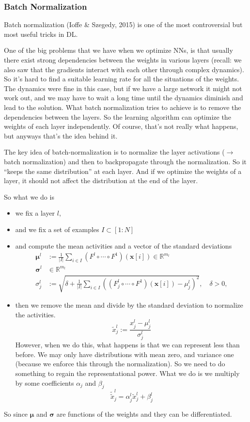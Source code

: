 \documentclass[a2paper,8pt]{extarticle}
\newcommand{\R}{\mathbb{R}}
\newcommand{\card}[1]{\left\lvert #1 \right\rvert}
\renewcommand{\vec}[1]{\mathbf{#1}}
\newcommand{\vx}{\vec{x}}
\newcommand{\vmu}{\boldsymbol{\mu}}
\newcommand{\vsigma}{\boldsymbol{\sigma}}
\newcommand{\ssep}{\hdashrule[1.1ex]{\linewidth}{0.1pt}{0.3mm}\vspace{-6pt}}
\newcommand{\ssep}{\hdashrule[1.1ex]{\linewidth}{0.1pt}{0.3mm}\vspace{-3pt}}
\begin{document}
\begin{landscape}
\begin{multicols*}{7}
\subsubsection{Batch Normalization}

Batch normalization (Ioffe \& Szegedy, 2015) is one of the most controversial
but most useful tricks in DL. 

One of the big problems that we have when we optimize NNs, is that usually there
exist strong dependencies between the weights in various layers (recall: we also
saw that the gradients interact with each other through complex dynamics). So
it's hard to find a suitable learning rate for all the situations of the
weights. The dynamics were fine in this case, but if we have a large network it
might not work out, and we may have to wait a long time until the dynamics
diminish and lead to the solution. What batch normalization tries to achieve is
to remove the dependencies between the layers. So the learning algorithm can
optimize the weights of each layer independently. Of course, that's not really
what happens, but anyways that's the idea behind it.

\ssep

The key idea of batch-normalization is to normalize the layer activations
($\to$ batch normalization) and then to backpropagate through the normalization.
So it ``keeps the same distribution'' at each layer. And if we optimize the
weights of a layer, it should not affect the distribution at the end of the
layer.

So what we do is
\begin{itemize}
  \item we fix a layer $l$,
  \item and we fix a set of examples $I\subset[1:N]$
  \item and compute the mean activities and a vector of the standard deviations
\begin{align*}
\vmu^{l}
&:=
\frac{1}{\card{I}}
\sum_{i\in I}
(F^l\circ\cdots\circ F^1)(\vx[i])\in\R^{m_l}
\\
\vsigma^l&\in\R^{m_l}
\\
\sigma_j^l
&:=
\sqrt{
\delta
+
\frac{1}{\card{I}}
\sum_{i\in I}
\left(
(F^l_j\circ\cdots\circ F^1)(\vx[i])
-\mu_j^l
\right)^2
},
\quad
\delta > 0,
\end{align*}
  \item then we remove the mean and divide by the standard deviation to
  normalize the activities.
  \[
  \tilde{x}_j^l
  :=\frac{x_j^l-\mu_j^l}{\sigma_j^l}
  \]
  However, when we do this, what happens is that we can represent less than
  before. We may only have distributions with mean zero, and variance one
  (because we enforce this through the normalization). So we need to do
  something to regain the representational power. What we do is we multiply by
  some coefficients $\alpha_j$ and $\beta_j$
  \[
  \tilde{\tilde{x}}_j^l=\alpha_j^l\tilde{x}_j^l+\beta_j^l
  \]
\end{itemize}
So since $\vmu$ and $\vsigma$ are functions of the weights and they can be
differentiated. 


\end{multicols*}
\end{landscape}
\end{document}
